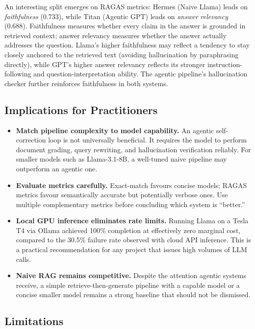 \documentclass[12pt]{article}
\begin{document}
An interesting split emerges on RAGAS metrics: Hermes (Naive Llama) leads on
\emph{faithfulness} (0.733), while Titan (Agentic GPT) leads on
\emph{answer relevancy} (0.688).  Faithfulness measures whether every claim
in the answer is grounded in retrieved context; answer relevancy measures
whether the answer actually addresses the question.  Llama's higher faithfulness
may reflect a tendency to stay closely anchored to the retrieved text (avoiding
hallucination by paraphrasing directly), while GPT's higher answer relevancy
reflects its stronger instruction-following and question-interpretation ability.
The agentic pipeline's hallucination checker further reinforces faithfulness in
both systems.

\subsection{Implications for Practitioners}

\begin{itemize}
    \item \textbf{Match pipeline complexity to model capability.}  An agentic
          self-correction loop is not universally beneficial.  It requires the
          model to perform document grading, query rewriting, and hallucination
          verification reliably.  For smaller models such as Llama-3.1-8B, a
          well-tuned naive pipeline may outperform an agentic one.
    \item \textbf{Evaluate metrics carefully.}  Exact-match favours concise
          models; RAGAS metrics favour semantically accurate but potentially
          verbose ones.  Use multiple complementary metrics before concluding
          which system is ``better.''
    \item \textbf{Local GPU inference eliminates rate limits.}  Running Llama
          on a Tesla T4 via Ollama achieved 100\% completion at effectively
          zero marginal cost, compared to the 30.5\% failure rate observed
          with cloud API inference.  This is a practical recommendation for
          any project that issues high volumes of LLM calls.
    \item \textbf{Naive RAG remains competitive.}  Despite the attention
          agentic systems receive, a simple retrieve-then-generate pipeline
          with a capable model or a concise smaller model remains a strong
          baseline that should not be dismissed.
\end{itemize}

\subsection{Limitations}
\end{document}
